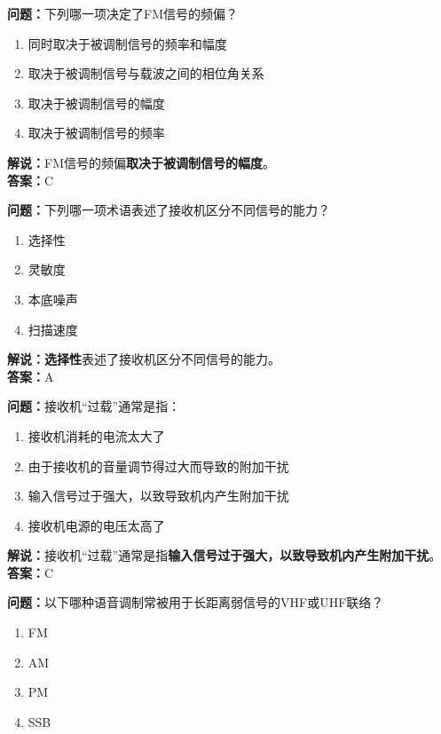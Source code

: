 \textbf{问题：}下列哪一项决定了FM信号的频偏？

\begin{enumerate}[label=\Alph*), leftmargin=1.5cm]
	\item 同时取决于被调制信号的频率和幅度
	\item 取决于被调制信号与载波之间的相位角关系
	\item 取决于被调制信号的幅度
	\item 取决于被调制信号的频率
\end{enumerate}

\textbf{解说：}FM信号的频偏\textbf{取决于被调制信号的幅度}。\\\textbf{答案：}C%



\textbf{问题：}下列哪一项术语表述了接收机区分不同信号的能力？

\begin{enumerate}[label=\Alph*), leftmargin=1.5cm]
	\item 选择性
	\item 灵敏度
	\item 本底噪声
	\item 扫描速度
\end{enumerate}

\textbf{解说：}\textbf{选择性}表述了接收机区分不同信号的能力。\\\textbf{答案：}A%



\textbf{问题：}接收机“过载”通常是指：

\begin{enumerate}[label=\Alph*), leftmargin=1.5cm]
	\item 接收机消耗的电流太大了
	\item 由于接收机的音量调节得过大而导致的附加干扰
	\item 输入信号过于强大，以致导致机内产生附加干扰
	\item 接收机电源的电压太高了
\end{enumerate}

\textbf{解说：}接收机“过载”通常是指\textbf{输入信号过于强大，以致导致机内产生附加干扰}。\\\textbf{答案：}C%



\textbf{问题：}以下哪种语音调制常被用于长距离弱信号的VHF或UHF联络？

\begin{enumerate}[label=\Alph*), leftmargin=1.5cm]
	\item FM
	\item AM
	\item PM
	\item SSB
\end{enumerate}

